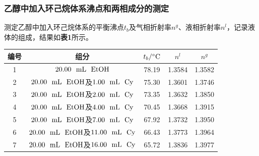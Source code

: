 \documentclass[12pt]{article}
\begin{document}
 \subsubsection{乙醇中加入环己烷体系沸点和两相成分的测定}
 测定乙醇中加入环己烷体系的平衡沸点$t_{b}$及气相折射率$n^{g}$、液相折射率$n^{l}$，记录液体的组成，结果如\textbf{表1}所示。
\begin{table}[h]
	\centering
	\begin{tabular}{ccccc}
		\toprule
		编号 & 组分 & $t_{b}/{\rm ^{\circ}C}$& $n^{l}$ & $n^{g}$ \\
		\midrule
		1 & $20.00\ \ {\rm mL\ \ } \ce{EtOH}$ & 78.19 & 1.3584 & 1.3582 \\
		2 & $20.00\ \ {\rm mL\ \ } \ce{EtOH}$及$1.00\ \ {\rm mL\ \ } \ce{Cy}$  & 75.30 & 1.3601 & 1.3746 \\
		3 & $20.00\ \ {\rm mL\ \ } \ce{EtOH}$及$2.00\ \ {\rm mL\ \ } \ce{Cy}$  & 73.35 & 1.3632 & 1.3850 \\
		4 & $20.00\ \ {\rm mL\ \ } \ce{EtOH}$及$4.00\ \ {\rm mL\ \ } \ce{Cy}$  & 70.45 & 1.3668 & 1.3915 \\
		5 & $20.00\ \ {\rm mL\ \ } \ce{EtOH}$及$7.00\ \ {\rm mL\ \ } \ce{Cy}$  & 67.92 & 1.3732 & 1.3950 \\
		6 & $20.00\ \ {\rm mL\ \ } \ce{EtOH}$及$11.00\ \ {\rm mL\ \ } \ce{Cy}$  & 66.43 & 1.3773 & 1.3964 \\
		7 & $20.00\ \ {\rm mL\ \ } \ce{EtOH}$及$16.00\ \ {\rm mL\ \ } \ce{Cy}$  & 65.72 & 1.3836 & 1.3977 \\
		\bottomrule
	\end{tabular}
\end{table}
\par
\end{document}
